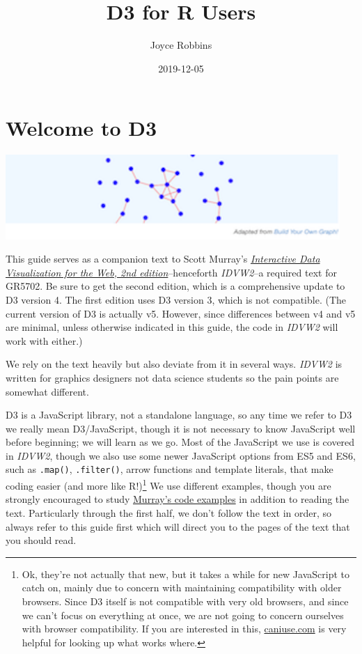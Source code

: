 \documentclass[openany]{book}
\title{D3 for R Users}
\author{Joyce Robbins}
\date{2019-12-05}
\let\rmarkdownfootnote\footnote%
\def\footnote{\protect\rmarkdownfootnote}
\begin{document}
\maketitle

{
\setcounter{tocdepth}{1}
\tableofcontents
}
\hypertarget{welcome-to-d3}{%
\chapter*{Welcome to D3}\label{welcome-to-d3}}

\hypertarget{container}{}

\begin{center}\includegraphics[width=5in]{images/networkgraph} \end{center}

This guide serves as a companion text to Scott Murray's \href{https://www.amazon.com/Interactive-Data-Visualization-Web-Introduction/dp/1491921285/}{\emph{Interactive Data Visualization for the Web, 2nd edition}}--henceforth \emph{IDVW2}--a required text for GR5702. Be sure to get the second edition, which is a comprehensive update to D3 version 4. The first edition uses D3 version 3, which is not compatible. (The current version of D3 is actually v5. However, since differences between v4 and v5 are minimal, unless otherwise indicated in this guide, the code in \emph{IDVW2} will work with either.)

We rely on the text heavily but also deviate from it in several ways. \emph{IDVW2} is written for graphics designers not data science students so the pain points are somewhat different.

D3 is a JavaScript library, not a standalone language, so any time we refer to D3 we really mean D3/JavaScript, though it is not necessary to know JavaScript well before beginning; we will learn as we go. Most of the JavaScript we use is covered in \emph{IDVW2}, though we also use some newer JavaScript options from ES5 and ES6, such as \texttt{.map()}, \texttt{.filter()}, arrow functions and template literals, that make coding easier (and more like R!)\footnote{Ok, they're not actually that new, but it takes a while for new JavaScript to catch on, mainly due to concern with maintaining compatibility with older browsers. Since D3 itself is not compatible with very old browsers, and since we can't focus on everything at once, we are not going to concern ourselves with browser compatibility. If you are interested in this, \href{https://caniuse.com}{caniuse.com} is very helpful for looking up what works where.} We use different examples, though you are strongly encouraged to study \href{https://github.com/alignedleft/d3-book/releases}{Murray's code examples} in addition to reading the text. Particularly through the first half, we don't follow the text in order, so always refer to this guide first which will direct you to the pages of the text that you should read.
\end{document}
